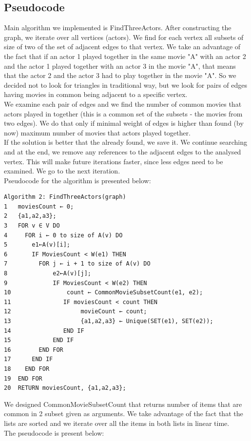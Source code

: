 \subsection{Pseudocode}
Main algorithm we implemented is FindThreeActors. After constructing the graph, we iterate over all vertices (actors). We find for each vertex all subsets of size of two of the set of adjacent edges to that vertex. We take an advantage of the fact that if an actor 1 played together in the same movie "A" with an actor 2 and the actor 1 played together with an actor 3 in the movie "A", that means that the actor 2 and the actor 3 had to play together in the movie "A". So we decided not to look for triangles in traditional way, but we look for pairs of edges having movies in common being adjacent to a specific vertex.
\\
We examine each pair of edges and we find the number of common movies that actors played in together (this is a common set of the subsets - the movies from two edges).  We do that only if minimal weight of edges is higher than found (by now) maximum number of movies that actors played together. 
\\
If the solution is better that the already found, we save it. We continue searching and at the end, we remove any references to the adjacent edges to the analysed vertex. This will make future iterations faster, since less edges need to be examined. We go to the next iteration. 
\\
Pseudocode for the algorithm is presented below:

\begin{verbatim}
Algorithm 2: FindThreeActors(graph)
1	moviesCount ← 0;
2	{a1,a2,a3};
3	FOR v ∈ V DO
4	  FOR i ← 0 to size of A(v) DO
5	    e1←A(v)[i];
6	    IF MoviesCount < W(e1) THEN
7	      FOR j ← i + 1 to size of A(v) DO	          
8	          e2←A(v)[j];
9	          IF MoviesCount < W(e2) THEN
10	              count ← CommonMovieSubsetCount(e1, e2);
11	             IF moviesCount < count THEN
12	                  movieCount ← count;
13	                  {a1,a2,a3} ← Unique(SET(e1), SET(e2));
14	             END IF
15	          END IF
16	      END FOR
17	    END IF
18	  END FOR
19	END FOR
20	RETURN moviesCount, {a1,a2,a3};	  	                    	  
\end{verbatim}


We designed CommonMovieSubsetCount that returns number of items that are common in 2 subset given as arguments. We take advantage of the fact that the lists are sorted and we iterate over all the items in both lists in linear time. 
\\
The pseudocode is present below:

